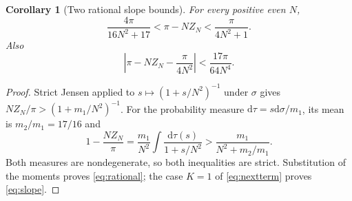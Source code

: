 \documentclass[10pt]{article}
\newtheorem{corollary}[theorem]{Corollary}
\newcommand{\dd}{\mathrm d}
\begin{document}
\begin{corollary}[Two rational slope bounds]
For every positive even $N$,
\begin{equation}
\boxed{\quad\frac{4\pi}{16N^2+17}<\pi-NZ_N<
\frac\pi{4N^2+1}.\quad}\label{eq:rational}
\end{equation}
Also
\begin{equation}
\left|\pi-NZ_N-\frac\pi{4N^2}\right|
<\frac{17\pi}{64N^4}.\label{eq:slope}
\end{equation}
\end{corollary}
\begin{proof}
Strict Jensen applied to $s\mapsto(1+s/N^2)^{-1}$ under $\sigma$
gives $NZ_N/\pi>(1+m_1/N^2)^{-1}$. For the probability measure
$\dd\tau=s\dd\sigma/m_1$, its mean is $m_2/m_1=17/16$ and
\[
1-\frac{NZ_N}\pi=\frac{m_1}{N^2}
\int\frac{\dd\tau(s)}{1+s/N^2}
>\frac{m_1}{N^2+m_2/m_1}.
\]
Both measures are nondegenerate, so both inequalities are strict.
Substitution of the moments proves \eqref{eq:rational}; the case
$K=1$ of \eqref{eq:nextterm} proves \eqref{eq:slope}.
\end{proof}
\end{document}
